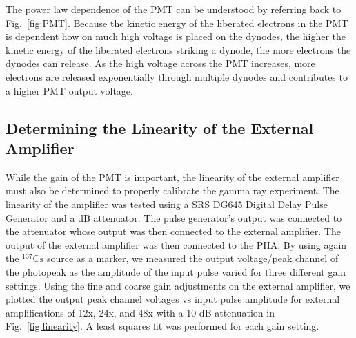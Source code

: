 \documentclass[%
 aip,
rsi,%
 amsmath,amssymb,
 reprint,%
author-numerical,%
]{revtex4-1}
\begin{document}
The power law dependence of the PMT can be understood by referring back to Fig.~\ref{fig:PMT}. Because the kinetic energy of the liberated electrons in the PMT is dependent how on much high voltage is placed on the dynodes, the higher the kinetic energy of the liberated electrons striking a dynode, the more electrons the dynodes can release. As the high voltage across the PMT increases, more electrons are released exponentially through multiple dynodes and contributes to a higher PMT output voltage.


\subsection{Determining the Linearity of the External Amplifier}
While the gain of the PMT is important, the linearity of the external amplifier must also be determined to properly calibrate the gamma ray experiment. The linearity of the amplifier was tested using a SRS DG645 Digital Delay Pulse Generator and a dB attenuator. \newline
\indent The pulse generator's output was connected to the attenuator whose output was then connected to the external amplifier. The output of the external amplifier was then connected to the PHA. \newline
\indent By using again the $\mathrm {  ^ { 137 }Cs }$ source as a marker, we measured the output voltage/peak channel of the photopeak as the amplitude of the input pulse varied for three different gain settings. Using the fine and coarse gain adjustments on the external amplifier, we plotted the output peak channel voltages vs input pulse amplitude for external amplifications of 12x, 24x, and 48x with a 10 dB attenuation in Fig.~\ref{fig:linearity}. A least squares fit was performed for each gain setting.
\end{document}
